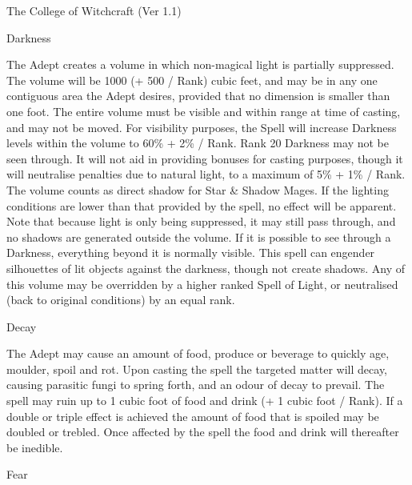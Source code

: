 \begin{Chapter}{The College of Witchcraft (Ver 1.1)}
\begin{spell}[G-2]{Darkness}
\begin{effects}
The Adept creates a volume in which non-magical light is partially
suppressed.  The volume will be 1000 (+ 500 / Rank) cubic feet, and
may be in any one contiguous area the Adept desires, provided that no
dimension is smaller than one foot.  The entire volume must be visible
and within range at time of casting, and may not be moved.  For
visibility purposes, the Spell will increase Darkness levels within
the volume to 60\% + 2\% / Rank.  Rank 20 Darkness may not be seen
through. It will not aid in providing bonuses for casting purposes,
though it will neutralise penalties due to natural light, to a maximum
of 5\% + 1\% / Rank. The volume counts as direct shadow for Star \&
Shadow Mages.  If the lighting conditions are lower than that provided
by the spell, no effect will be apparent.  Note that because light is
only being suppressed, it may still pass through, and no shadows are
generated outside the volume. If it is possible to see through a
Darkness, everything beyond it is normally visible.  This spell can
engender silhouettes of lit objects against the darkness, though not
create shadows.  Any of this volume may be overridden by a higher
ranked Spell of Light, or neutralised (back to original conditions) by
an equal rank.
\end{effects}
\end{spell}

\begin{spell}[G-3]{Decay}

\begin{effects}
The Adept may cause an amount of food, produce or beverage to quickly
age, moulder, spoil and rot.  Upon casting the spell the targeted
matter will decay, causing parasitic fungi to spring forth, and an
odour of decay to prevail.  The spell may ruin up to 1 cubic foot of
food and drink (+ 1 cubic foot / Rank). If a double or triple effect
is achieved the amount of food that is spoiled may be doubled or
trebled. Once affected by the spell the food and drink will thereafter
be inedible.
\end{effects}
\end{spell}

\begin{spell}[G-4]{Fear}


\end{spell}
\end{Chapter}
